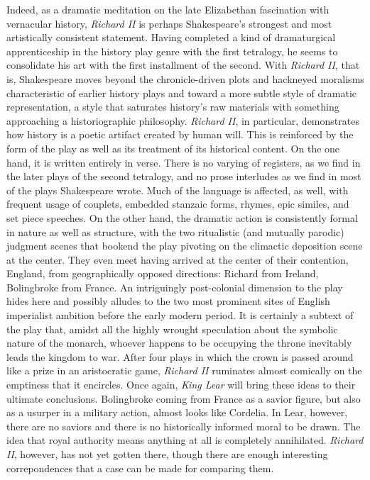 Indeed, as a dramatic meditation on the late Elizabethan fascination with vernacular history, \emph{Richard II} is perhaps Shakespeare’s strongest and most artistically consistent statement.
Having completed a kind of dramaturgical apprenticeship in the history play genre with the first tetralogy, he seems to consolidate his art with the first installment of the second.
With \emph{Richard II}, that is, Shakespeare moves beyond the chronicle-driven plots and hackneyed moralisms characteristic of earlier history plays and toward a more subtle style of dramatic representation, a style that saturates history’s raw materials with something approaching a historiographic philosophy.
\emph{Richard II}, in particular, demonstrates how history is a poetic artifact created by human will.
This is reinforced by the form of the play as well as its treatment of its historical content.
On the one hand, it is written entirely in verse.
There is no varying of registers, as we find in the later plays of the second tetralogy, and no prose interludes as we find in most of the plays Shakespeare wrote.
Much of the language is affected, as well, with frequent usage of couplets, embedded stanzaic forms, rhymes, epic similes, and set piece speeches.
On the other hand, the dramatic action is consistently formal in nature as well as structure, with the two ritualistic (and mutually parodic) judgment scenes that bookend the play pivoting on the climactic deposition scene at the center.
They even meet having arrived at the center of their contention, England, from geographically opposed directions: Richard from Ireland, Bolingbroke from France.
An intriguingly post-colonial dimension to the play hides here and possibly alludes to the two most prominent sites of English imperialist ambition before the early modern period.
It is certainly a subtext of the play that, amidst all the highly wrought speculation about the symbolic nature of the monarch, whoever happens to be occupying the throne inevitably leads the kingdom to war.
After four plays in which the crown is passed around like a prize in an aristocratic game, \emph{Richard II} ruminates almost comically on the emptiness that it encircles.
Once again, \emph{King Lear} will bring these ideas to their ultimate conclusions.
Bolingbroke coming from France as a savior figure, but also as a usurper in a military action, almost looks like Cordelia.
In Lear, however, there are no saviors and there is no historically informed moral to be drawn.
The idea that royal authority means anything at all is completely annihilated.
\emph{Richard II}, however, has not yet gotten there, though there are enough interesting correpondences that a case can be made for comparing them.

